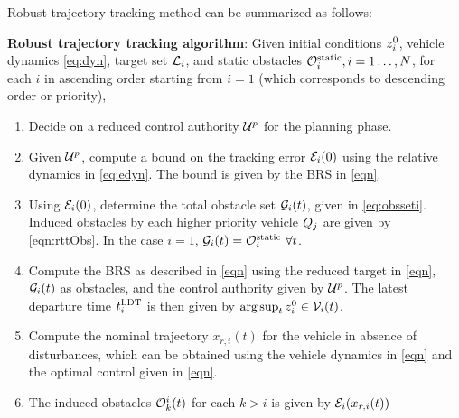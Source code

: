 Robust trajectory tracking method can be summarized as follows:
\begin{alg}
\label{alg:rtt}
\textbf{Robust trajectory tracking algorithm}: Given initial conditions $z_i^0$, vehicle dynamics \eqref{eq:dyn}, target set $\mathcal{L}_i$, and static obstacles $\mathcal{O}^\text{static}_i, i = 1\ldots, N$, for each $i$ in ascending order starting from $i=1$ (which corresponds to descending order or priority),
\begin{enumerate}
\item Decide on a reduced control authority $\mathcal{U}^p$ for the planning phase. 
\item Given $\mathcal{U}^p$, compute a bound on the tracking error $\mathcal{E}_i(0)$ using the relative dynamics in \eqref{eq:edyn}. The bound is given by the BRS in \eqref{eqn}.
\item Using $\mathcal{E}_i(0)$, determine the total obstacle set $\mathcal{G}_i(t)$, given in \eqref{eq:obsseti}. Induced obstacles by each higher priority vehicle $Q_j$ are given by \eqref{eqn:rttObs}. In the case $i=1$, $\mathcal{G}_i(t) = \mathcal{O}^\text{static}_i ~ \forall t$.
\item Compute the BRS as described in \eqref{eqn} using the reduced target in \eqref{eqn}, $\mathcal{G}_i(t)$ as obstacles, and the control authority given by $\mathcal{U}^p$. The latest departure time $t^\text{LDT}_i$ is then given by $\arg \sup_t z^0_i \in \mathcal{V}_i(t)$.
\item Compute the nominal trajectory $x_{r,i}(t)$ for the vehicle in absence of disturbances, which can be obtained using the vehicle dynamics in \eqref{eqn} and the optimal control given in \eqref{eqn}.
\item The induced obstacles $\mathcal{O}_k^i(t)$ for each $k>i$ is given by $\mathcal{E}_i(x_{r,i}(t))$
\end{enumerate}
\end{alg}


